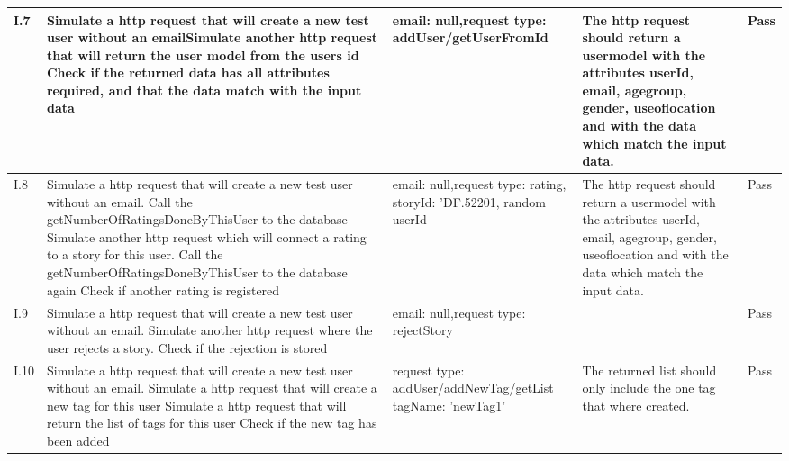 {{\begin{longtable}{ | p{1cm} | p{6.5cm} | p{3cm} | p{6.5cm} |}
			I.7 & Simulate a http request that will create a new test user without an email\newline  Simulate another http request that will return the user model from the users id \newline Check if the returned data has all attributes required, and that the data match with the input data & email: null,\newline request type: addUser/getUserFromId  & The http request should return a usermodel with the attributes userId, email, age\textunderscore group, gender, use\textunderscore of\textunderscore location and with the data which match the input data. & Pass\\ \hline
			
			I.8 & Simulate a http request that will create a new test user without an email. \newline Call the getNumberOfRatingsDoneByThisUser to the database \newline  Simulate another http request which will connect a rating to a story for this user.  \newline Call the getNumberOfRatingsDoneByThisUser to the database again \newline Check if another rating is registered & email: null,\newline request type: rating, storyId: 'DF.52201, random userId  & The http request should return a usermodel with the attributes userId, email, age\textunderscore group, gender, use\textunderscore of\textunderscore location and with the data which match the input data. & Pass \\ \hline
			
			I.9 & Simulate a http request that will create a new test user without an email. \newline  \newline  Simulate another http request where the user rejects a story.  \newline  \newline Check if the rejection is stored & email: null,\newline request type: rejectStory  &  & Pass \\ \hline

			I.10 & Simulate a http request that will create a new test user without an email. \newline  Simulate a http request that will create a new tag for this user \newline Simulate a http request that will return the list of tags for this user \newline Check if the new tag has been added  & request type: addUser/addNewTag/getList  tagName: 'newTag1' & The returned list should only include the one tag that where created.& Pass\\ \hline
			

\end{longtable}}}
